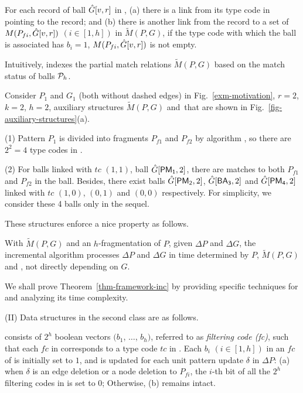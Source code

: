 For each record of ball $\hat{G}{[v,r]}$ in \bs, (a) there is a link from its type code in \fs pointing to the record; and
(b) there is another link from the record to a set of $M({P}_{fi}, \hat{G}{[v,r]})$ $(i\in [1,h])$ in $\tilde{M}(P,G)$,
if the type code with which the ball is associated has $b_i = 1$, \ie $M({P}_{fi}, \hat{G}{[v,r]})$ is not empty.

Intuitively, \fb indexes the partial match relations $\tilde{M}(P,G)$ based on the match status of balls \wrt ${\cal P}_h$.




\begin{example}
\label{exa-matchindex}
Consider $P_1$ and $G_1$ (both without dashed edges) in Fig.~\ref{exm-motivation}, $r=2$, $k=2$, $h=2$,
auxiliary structures $\tilde{M}(P,G)$ and \fb\,that are shown in Fig.~\ref{fig-auxiliary-structures}(a).

\ni (1) Pattern $P_1$ is divided into fragments $P_{f1}$ and $P_{f2}$ by algorithm ,
so there are $2^2=4$ type codes in \fs.

\ni (2) For balls linked with $tc$ $(1, 1)$, \eg ball $\hat{G}{[{\mathsf{PM_1}},2]}$,
there are matches to both $P_{f1}$ and $P_{f2}$ in the ball.
Besides, there exist balls $\hat{G}{[{\mathsf{PM_2}},2]}$, $\hat{G}{[{\mathsf{BA_3}},2]}$ and $\hat{G}{[{\mathsf{PM_4}},2]}$
linked with $tc$ $(1, 0)$, $(0, 1)$ and $(0, 0)$ respectively. 
%
For simplicity, we consider these 4 balls only in the sequel.
\end{example}


These structures enforce a nice property as follows.

\begin{theorem}
\label{thm-framework-inc}
With $\tilde{M}(P,G)$ and \fb \wrt an $h$-fragmentation of $P$, given $\Delta P$ and $\Delta G$,
the incremental algorithm \inc processes $\Delta P$ and $\Delta G$ in time
determined by $P$, $\tilde{M}(P,G)$ and \affballsx, not directly depending on $G$.
\end{theorem}

We shall prove Theorem~\ref{thm-framework-inc} by providing specific techniques for \inc and analyzing its time complexity.



\stab(II) Data structures in the second class are as follows.

\vspace{0.5ex}
 consists of $2^{h}$ boolean vectors $(b_1$, $\ldots$, $b_h)$, referred to as {\em filtering code (fc)},
such that each $fc$ in \bfc corresponds to a type code $tc$ in \fs.
Each $b_i$ $(i\in [1, h])$ in an $fc$ of \bfc is initially set to $1$,
and is updated for each unit pattern update $\delta$ in $\Delta P$:
(a) when $\delta$ is an edge deletion or a node deletion to ${P}_{fi}$,
the $i$-th bit of all the $2^{h}$ filtering codes in \bfc is set to $0$; Otherwise, (b) \bfc remains intact.


